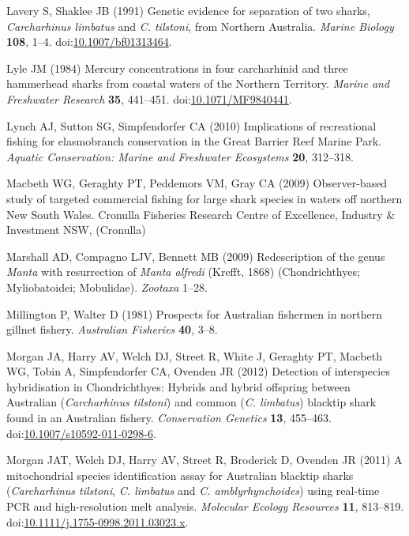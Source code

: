 \documentclass[]{article}
\begin{document}
\leavevmode\hypertarget{ref-lavery_genetic_1991}{}%
Lavery S, Shaklee JB (1991) Genetic evidence for separation of two
sharks, \emph{Carcharhinus limbatus} and \emph{C. tilstoni}, from
Northern Australia. \emph{Marine Biology} \textbf{108}, 1--4.
doi:\href{https://doi.org/10.1007/bf01313464}{10.1007/bf01313464}.

\leavevmode\hypertarget{ref-lyle_mercury_1984}{}%
Lyle JM (1984) Mercury concentrations in four carcharhinid and three
hammerhead sharks from coastal waters of the Northern Territory.
\emph{Marine and Freshwater Research} \textbf{35}, 441--451.
doi:\href{https://doi.org/10.1071/MF9840441}{10.1071/MF9840441}.

\leavevmode\hypertarget{ref-lynch_implications_2010}{}%
Lynch AJ, Sutton SG, Simpfendorfer CA (2010) Implications of
recreational fishing for elasmobranch conservation in the Great Barrier
Reef Marine Park. \emph{Aquatic Conservation: Marine and Freshwater
Ecosystems} \textbf{20}, 312--318.

\leavevmode\hypertarget{ref-macbeth_observer-based_2009}{}%
Macbeth WG, Geraghty PT, Peddemors VM, Gray CA (2009) Observer-based
study of targeted commercial fishing for large shark species in waters
off northern New South Wales. Cronulla Fisheries Research Centre of
Excellence, Industry \& Investment NSW, (Cronulla)

\leavevmode\hypertarget{ref-marshall_redescription_2009}{}%
Marshall AD, Compagno LJV, Bennett MB (2009) Redescription of the genus
\emph{Manta} with resurrection of \emph{Manta alfredi} (Krefft, 1868)
(Chondrichthyes; Myliobatoidei; Mobulidae). \emph{Zootaxa} 1--28.

\leavevmode\hypertarget{ref-millington_prospects_1981}{}%
Millington P, Walter D (1981) Prospects for Australian fishermen in
northern gillnet fishery. \emph{Australian Fisheries} \textbf{40}, 3--8.

\leavevmode\hypertarget{ref-morgan_detection_2012}{}%
Morgan JA, Harry AV, Welch DJ, Street R, White J, Geraghty PT, Macbeth
WG, Tobin A, Simpfendorfer CA, Ovenden JR (2012) Detection of
interspecies hybridisation in Chondrichthyes: Hybrids and hybrid
offspring between Australian (\emph{Carcharhinus tilstoni}) and common
(\emph{C. limbatus}) blacktip shark found in an Australian fishery.
\emph{Conservation Genetics} \textbf{13}, 455--463.
doi:\href{https://doi.org/10.1007/s10592-011-0298-6}{10.1007/s10592-011-0298-6}.

\leavevmode\hypertarget{ref-morgan_mitochondrial_2011}{}%
Morgan JAT, Welch DJ, Harry AV, Street R, Broderick D, Ovenden JR (2011)
A mitochondrial species identification assay for Australian blacktip
sharks (\emph{Carcharhinus tilstoni}, \emph{C. limbatus} and \emph{C.
amblyrhynchoides}) using real-time PCR and high-resolution melt
analysis. \emph{Molecular Ecology Resources} \textbf{11}, 813--819.
doi:\href{https://doi.org/10.1111/j.1755-0998.2011.03023.x}{10.1111/j.1755-0998.2011.03023.x}.
\end{document}
